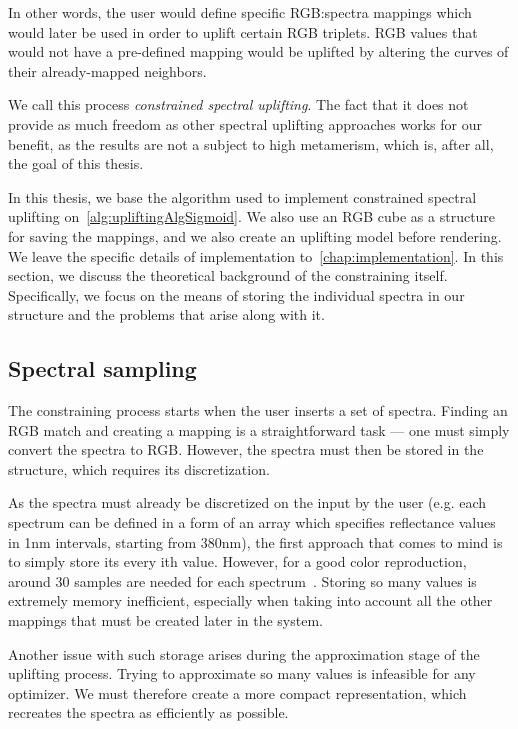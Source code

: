 In other words, the user would define specific RGB:spectra mappings which would later be used in order to uplift certain RGB triplets. RGB values that would not have a pre-defined mapping would be uplifted by altering the curves of their already-mapped neighbors. 

We call this process \emph{constrained spectral uplifting}. The fact that it does not provide as much freedom as other spectral uplifting approaches works for our benefit, as the results are not a subject to high metamerism, which is, after all, the goal of this thesis.

In this thesis, we base the algorithm used to implement constrained spectral uplifting on~\cref{alg:upliftingAlgSigmoid}. We also use an RGB cube as a structure for saving the mappings, and we also create an uplifting model before rendering. We leave the specific details of implementation to~\cref{chap:implementation}. In this section, we discuss the theoretical background of the constraining itself. Specifically, we focus on the means of storing the individual spectra in our structure and the problems that arise along with it.

\subsection{Spectral sampling}

The constraining process starts when the user inserts a set of spectra. Finding an RGB match and creating a mapping is a straightforward task --- one must simply convert the spectra to RGB. However, the spectra must then be stored in the structure, which requires its discretization.

As the spectra must already be discretized on the input by the user (e.g. each spectrum can be defined in a form of an array which specifies reflectance values in 1nm intervals, starting from 380nm), the first approach that comes to mind is to simply store its every ith value. However, for a good color reproduction, around 30 samples are needed for each spectrum~\cite{trigonometricMomentsPresentation}. Storing so many values is extremely memory inefficient, especially when taking into account all the other mappings that must be created later in the system.

Another issue with such storage arises during the approximation stage of the uplifting process. Trying to approximate so many values is infeasible for any optimizer. We must therefore create a more compact representation, which recreates the spectra as efficiently as possible.

